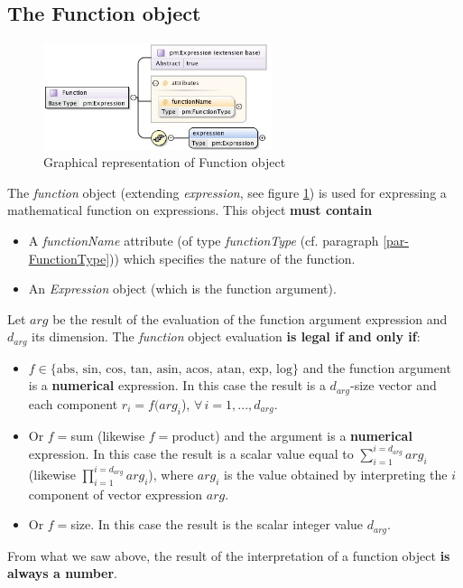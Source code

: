 \documentclass[a4paper,11pt] {ivoa}
\begin{document}
\subsection{The Function object}\label{par02_05}
\begin{figure}[htbp]
\begin{center}
\includegraphics[width=0.6\textwidth]{pictures/Function.jpg} 
\caption{Graphical representation of Function object}
\label{Pic-Function}
\end{center}
\end{figure}
The {\it function} object (extending {\it expression}, see figure \ref{Pic-Function}) is used for
expressing a mathematical function on expressions.
This object {\bf must contain} 
\begin{itemize}
\item A {\it functionName} attribute (of type {\it functionType} (cf. paragraph
\ref{par-FunctionType})) which specifies the nature of the function.
\item An {\it Expression} object (which is the function argument).\\
\end{itemize}
Let $arg$ be the result of the evaluation of the function argument expression and  $d_{arg}$ its
dimension.
The {\it function} object evaluation {\bf is legal if and only if}:
\begin{itemize}
\item $f  \in \{ \mbox{abs, sin, cos, tan, asin, acos, atan, exp, log} \}$ and the function argument
is a {\bf numerical} expression. In this case the  result  is a $d_{arg}$-size vector and each
component  $r_i = f(arg_i$), $\forall \, i=1,...,d_{arg}$.
\item Or $f=$sum (likewise $f=$product) and the argument is a {\bf numerical} expression. In this
case the result is a scalar value equal to $\sum_{i=1}^{i=d_{arg}} arg_i$ (likewise $\prod
_{i=1}^{i=d_{arg}} arg_i$), where $arg_i$ is the value obtained
by interpreting the $i$ component of vector expression $arg$.
\item Or $f=$size. In this case the result is the scalar integer value $d_{arg}$. 
\end{itemize}
From what we saw above, the result of the interpretation of a function object { \bf is always a number}.
\end{document}
